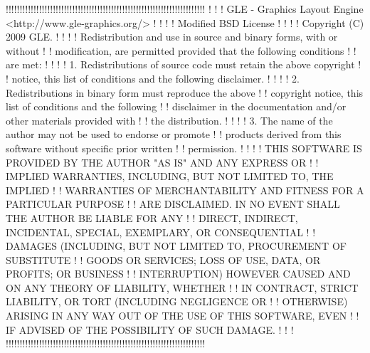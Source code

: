!!!!!!!!!!!!!!!!!!!!!!!!!!!!!!!!!!!!!!!!!!!!!!!!!!!!!!!!!!!!!!!!!!!!!!!!
!                                                                      !
! GLE - Graphics Layout Engine <http://www.gle-graphics.org/>          !
!                                                                      !
! Modified BSD License                                                 !
!                                                                      !
! Copyright (C) 2009 GLE.                                              !
!                                                                      !
! Redistribution and use in source and binary forms, with or without   !
! modification, are permitted provided that the following conditions   !
! are met:                                                             !
!                                                                      !
!    1. Redistributions of source code must retain the above copyright !
! notice, this list of conditions and the following disclaimer.        !
!                                                                      !
!    2. Redistributions in binary form must reproduce the above        !
! copyright notice, this list of conditions and the following          !
! disclaimer in the documentation and/or other materials provided with !
! the distribution.                                                    !
!                                                                      !
!    3. The name of the author may not be used to endorse or promote   !
! products derived from this software without specific prior written   !
! permission.                                                          !
!                                                                      !
! THIS SOFTWARE IS PROVIDED BY THE AUTHOR "AS IS" AND ANY EXPRESS OR   !
! IMPLIED WARRANTIES, INCLUDING, BUT NOT LIMITED TO, THE IMPLIED       !
! WARRANTIES OF MERCHANTABILITY AND FITNESS FOR A PARTICULAR PURPOSE   !
! ARE DISCLAIMED. IN NO EVENT SHALL THE AUTHOR BE LIABLE FOR ANY       !
! DIRECT, INDIRECT, INCIDENTAL, SPECIAL, EXEMPLARY, OR CONSEQUENTIAL   !
! DAMAGES (INCLUDING, BUT NOT LIMITED TO, PROCUREMENT OF SUBSTITUTE    !
! GOODS OR SERVICES; LOSS OF USE, DATA, OR PROFITS; OR BUSINESS        !
! INTERRUPTION) HOWEVER CAUSED AND ON ANY THEORY OF LIABILITY, WHETHER !
! IN CONTRACT, STRICT LIABILITY, OR TORT (INCLUDING NEGLIGENCE OR      !
! OTHERWISE) ARISING IN ANY WAY OUT OF THE USE OF THIS SOFTWARE, EVEN  !
! IF ADVISED OF THE POSSIBILITY OF SUCH DAMAGE.                        !
!                                                                      !
!!!!!!!!!!!!!!!!!!!!!!!!!!!!!!!!!!!!!!!!!!!!!!!!!!!!!!!!!!!!!!!!!!!!!!!!

